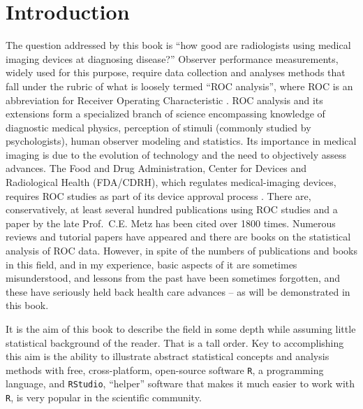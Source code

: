 \documentclass[
]{book}
\begin{document}
\hypertarget{preliminariesIntro}{%
\section{Introduction}\label{preliminariesIntro}}

The question addressed by this book is ``how good are radiologists using medical imaging devices at diagnosing disease?'' Observer performance measurements, widely used for this purpose, require data collection and analyses methods that fall under the rubric of what is loosely termed ``ROC analysis'', where ROC is an abbreviation for Receiver Operating Characteristic \citep{metz1978rocmethodology}. ROC analysis and its extensions form a specialized branch of science encompassing knowledge of diagnostic medical physics, perception of stimuli (commonly studied by psychologists), human observer modeling and statistics. Its importance in medical imaging is due to the evolution of technology and the need to objectively assess advances. The Food and Drug Administration, Center for Devices and Radiological Health (FDA/CDRH), which regulates medical-imaging devices, requires ROC studies as part of its device approval process . There are, conservatively, at least several hundred publications using ROC studies and a paper \citep{metz1978rocmethodology} by the late Prof.~C.E. Metz has been cited over 1800 times. Numerous reviews and tutorial papers have appeared \citep[\citet{metz1989some}, \citet{kundel2008receiver}, \citet{metz1986rocmethodology}]{metz1978rocmethodology} and there are books on the statistical analysis \citep{RN1443} of ROC data. However, in spite of the numbers of publications and books in this field, and in my experience, basic aspects of it are sometimes misunderstood, and lessons from the past have been sometimes forgotten, and these have seriously held back health care advances -- as will be demonstrated in this book.

It is the aim of this book to describe the field in some depth while assuming little statistical background of the reader. That is a tall order. Key to accomplishing this aim is the ability to illustrate abstract statistical concepts and analysis methods with free, cross-platform, open-source software \texttt{R}, a programming language, and \texttt{RStudio}, ``helper'' software that makes it much easier to work with \texttt{R}, is very popular in the scientific community.
\end{document}
